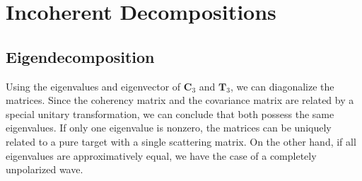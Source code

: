 \documentclass[11pt]{article}
\begin{document}
\section{Incoherent Decompositions}
\subsection{Eigendecomposition}
Using the eigenvalues and eigenvector of $\mathbf{C}_{3}$ and $\mathbf{T}_{3}$, we can diagonalize the matrices. Since the coherency matrix and the covariance matrix are related by a special unitary transformation, we can conclude that both possess the same eigenvalues. If only one eigenvalue is nonzero, the matrices can be uniquely related to a pure target with a single scattering matrix. On the other hand, if all eigenvalues are approximatively equal, we have the case of a completely unpolarized wave.
\end{document}

